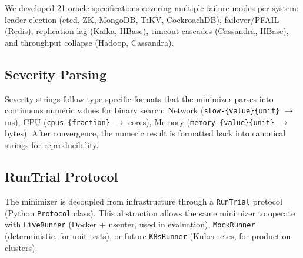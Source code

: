 We developed 21 oracle specifications covering multiple failure modes per
system: leader election (etcd, ZK, MongoDB, TiKV, CockroachDB), failover/PFAIL
(Redis), replication lag (Kafka, HBase), timeout cascades (Cassandra, HBase),
and throughput collapse (Hadoop, Cassandra).

\subsection{Severity Parsing}

Severity strings follow type-specific formats that the minimizer parses
into continuous numeric values for binary search:
Network (\texttt{slow-\{value\}\{unit\}} $\rightarrow$ ms),
CPU (\texttt{cpus-\{fraction\}} $\rightarrow$ cores),
Memory (\texttt{memory-\{value\}\{unit\}} $\rightarrow$ bytes).
After convergence, the numeric result is formatted back into canonical
strings for reproducibility.

\subsection{RunTrial Protocol}

The minimizer is decoupled from infrastructure through a \texttt{RunTrial}
protocol (Python \texttt{Protocol} class). This abstraction allows the same
minimizer to operate with \texttt{LiveRunner} (Docker + nsenter, used in
evaluation), \texttt{MockRunner} (deterministic, for unit tests), or future
\texttt{K8sRunner} (Kubernetes, for production clusters).
